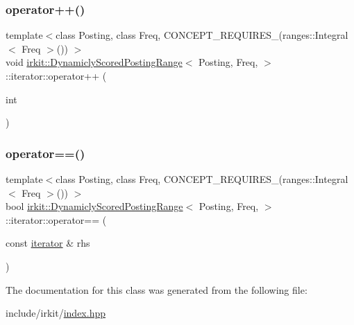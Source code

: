 \mbox{\label{classirkit_1_1DynamiclyScoredPostingRange_1_1iterator_a258d9907607cddfb69c41087efb67fab}} 
\subsubsection{\texorpdfstring{operator++()}{operator++()}\hspace{0.1cm}{\footnotesize\ttfamily [2/2]}}
{\footnotesize\ttfamily template$<$class Posting, class Freq, C\+O\+N\+C\+E\+P\+T\+\_\+\+R\+E\+Q\+U\+I\+R\+E\+S\+\_\+(ranges\+::\+Integral$<$ Freq $>$()) $>$ \\
void \hyperlink{classirkit_1_1DynamiclyScoredPostingRange}{irkit\+::\+Dynamicly\+Scored\+Posting\+Range}$<$ Posting, Freq, $>$\+::iterator\+::operator++ (\begin{DoxyParamCaption}\item[{int}]{ }\end{DoxyParamCaption})\hspace{0.3cm}{\ttfamily [inline]}}

\mbox{\label{classirkit_1_1DynamiclyScoredPostingRange_1_1iterator_a9dd3bf6576356e15bbd846e4f3590c8b}} 
\subsubsection{\texorpdfstring{operator==()}{operator==()}}
{\footnotesize\ttfamily template$<$class Posting, class Freq, C\+O\+N\+C\+E\+P\+T\+\_\+\+R\+E\+Q\+U\+I\+R\+E\+S\+\_\+(ranges\+::\+Integral$<$ Freq $>$()) $>$ \\
bool \hyperlink{classirkit_1_1DynamiclyScoredPostingRange}{irkit\+::\+Dynamicly\+Scored\+Posting\+Range}$<$ Posting, Freq, $>$\+::iterator\+::operator== (\begin{DoxyParamCaption}\item[{const \hyperlink{classirkit_1_1DynamiclyScoredPostingRange_1_1iterator}{iterator} \&}]{rhs }\end{DoxyParamCaption})\hspace{0.3cm}{\ttfamily [inline]}}



The documentation for this class was generated from the following file\+:\begin{DoxyCompactItemize}
\item 
include/irkit/\hyperlink{irkit_2index_8hpp}{index.\+hpp}\end{DoxyCompactItemize}
